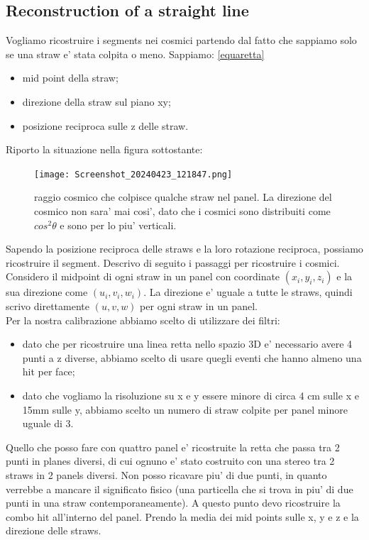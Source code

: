 \subsection{Reconstruction of a straight line}
Vogliamo ricostruire i segments nei cosmici partendo dal fatto che sappiamo solo se una straw e' stata colpita o meno. Sappiamo: \ref{equaretta}
\begin{itemize}
    \item mid point della straw;
    \item direzione della straw sul piano xy;
    \item posizione reciproca sulle z delle straw.
\end{itemize}
Riporto la situazione nella figura sottostante:
\begin{figure}
    \centering
    \texttt{[image: Screenshot\_20240423\_121847.png]}
    \caption{raggio cosmico che colpisce qualche straw nel panel. La direzione del cosmico non sara' mai cosi', dato che i cosmici sono distribuiti come $cos^2\theta$ e sono per lo piu' verticali.}
    \label{fig:rec}
\end{figure}
Sapendo la posizione reciproca delle straws e la loro rotazione reciproca, possiamo ricostruire il segment.
Descrivo di seguito i passaggi per ricostruire i cosmici.
Considero il midpoint di ogni straw in un panel con coordinate $(x_i,y_i,z_i)$ e la sua direzione come $(u_i,v_i,w_i)$. La direzione e' uguale a tutte le straws, quindi scrivo direttamente $(u,v,w)$ per ogni straw in un panel.
\\
Per la nostra calibrazione abbiamo scelto di utilizzare dei filtri:
\begin{itemize}
    \item dato che per ricostruire una linea retta nello spazio 3D e' necessario avere 4 punti a z diverse, abbiamo scelto di usare quegli eventi che hanno almeno una hit per face;
    \item dato che vogliamo la risoluzione su x e y essere minore di circa 4 cm sulle x e 15mm sulle y, abbiamo scelto un numero di straw colpite per panel minore uguale di 3.
\end{itemize}
Quello che posso fare con quattro panel e' ricostruite la retta che passa tra 2 punti in planes diversi, di cui ognuno e' stato costruito con una stereo tra 2 straws in 2 panels diversi. Non posso ricavare piu' di due punti, in quanto verrebbe a mancare il significato fisico (una particella che si trova in piu' di due punti in una straw contemporaneamente).
A questo punto devo ricostruire la combo hit all'interno del panel. Prendo la media dei mid points sulle x, y e z e la direzione delle straws. 
